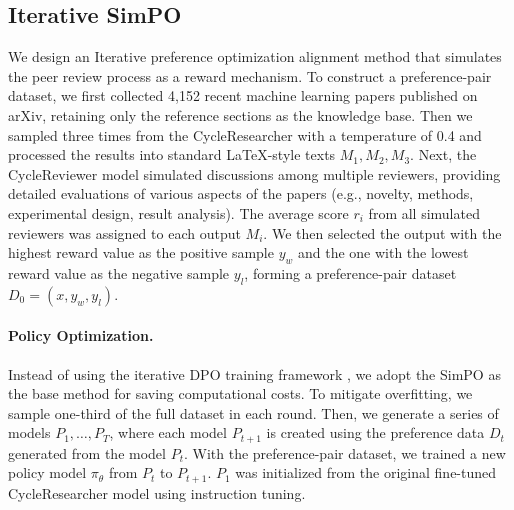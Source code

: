 \documentclass{article} %
\begin{document}
\subsection{Iterative SimPO}

We design an Iterative preference optimization alignment method \citep{xiong2024iterativepreferencelearninghuman,liu2024iterativelengthregularizeddirectpreference} that simulates the peer review process as a reward mechanism. To construct a preference-pair dataset, we first collected 4,152 recent machine learning papers published on arXiv, retaining only the reference sections as the knowledge base. Then we sampled three times from the CycleResearcher with a temperature of 0.4 and processed the results into standard LaTeX-style texts ${M_1, M_2, M_3}$. Next, the CycleReviewer model simulated discussions among multiple reviewers, providing detailed evaluations of various aspects of the papers (e.g., novelty, methods, experimental design, result analysis). The average score $r_i$ from all simulated reviewers was assigned to each output $M_i$. We then selected the output with the highest reward value as the positive sample $y_w$ and the one with the lowest reward value as the negative sample $y_l$, forming a preference-pair dataset $D_0 = {(x, y_w, y_l)}$.


\paragraph{Policy Optimization.} Instead of using the iterative DPO training framework \citep{pang2024iterative}, we adopt the SimPO as the base method for saving computational costs. To mitigate overfitting, we sample one-third of the full dataset in each round. Then, we generate a series of models $P_1, \dots, P_T$, where each model $P_{t+1}$ is created using the preference data $D_t$ generated from the model $P_t$. With the preference-pair dataset, we trained a new policy model $\pi_{\theta}$ from $P_t$ to $P_{t+1}$. $P_1$ was initialized from the original fine-tuned CycleResearcher model using instruction tuning.

\end{document}
